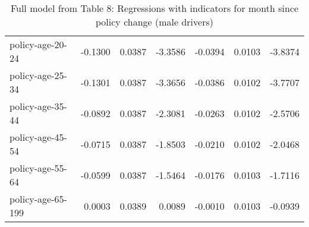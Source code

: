 \documentclass[10pt]{article}
\begin{document}
\begin{table}[ht]
\begin{tabular}{lrrrrrr}
  policy-age-20-24 & -0.1300 & 0.0387 & -3.3586 & -0.0394 & 0.0103 & -3.8374 \\ 
  policy-age-25-34 & -0.1301 & 0.0387 & -3.3656 & -0.0386 & 0.0102 & -3.7707 \\ 
  policy-age-35-44 & -0.0892 & 0.0387 & -2.3081 & -0.0263 & 0.0102 & -2.5706 \\ 
  policy-age-45-54 & -0.0715 & 0.0387 & -1.8503 & -0.0210 & 0.0102 & -2.0468 \\ 
  policy-age-55-64 & -0.0599 & 0.0387 & -1.5464 & -0.0176 & 0.0103 & -1.7116 \\ 
  policy-age-65-199 & 0.0003 & 0.0389 & 0.0089 & -0.0010 & 0.0103 & -0.0939 \\ 
   \hline
\end{tabular}
\caption{Full model from Table 8: Regressions with indicators for month since policy change (male drivers)} 
\label{tab_8_all_pts_M}
\end{table}


\clearpage
\pagebreak



\end{document}

